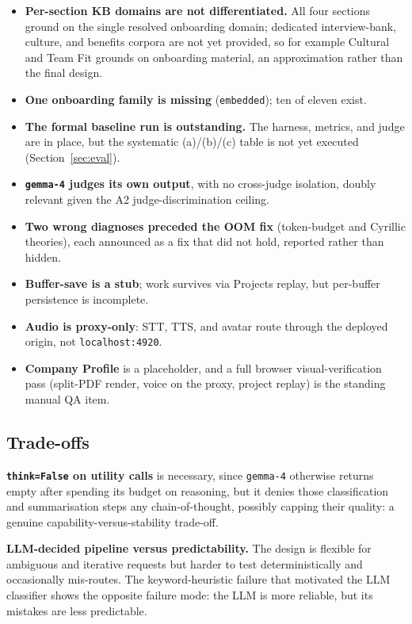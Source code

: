 \begin{itemize}
  \item \textbf{Per-section KB domains are not differentiated.} All four sections ground on
    the single resolved onboarding domain; dedicated interview-bank, culture, and benefits
    corpora are not yet provided, so for example Cultural and Team Fit grounds on onboarding
    material, an approximation rather than the final design.
  \item \textbf{One onboarding family is missing} (\texttt{embedded}); ten of eleven exist.
  \item \textbf{The formal baseline run is outstanding.} The harness, metrics, and judge are
    in place, but the systematic (a)/(b)/(c) table is not yet executed (Section~\ref{sec:eval}).
  \item \textbf{\texttt{gemma-4} judges its own output}, with no cross-judge isolation,
    doubly relevant given the A2 judge-discrimination ceiling.
  \item \textbf{Two wrong diagnoses preceded the OOM fix} (token-budget and Cyrillic
    theories), each announced as a fix that did not hold, reported rather than hidden.
  \item \textbf{Buffer-save is a stub}; work survives via Projects replay, but per-buffer
    persistence is incomplete.
  \item \textbf{Audio is proxy-only}: STT, TTS, and avatar route through the deployed
    origin, not \verb|localhost:4920|.
  \item \textbf{Company Profile} is a placeholder, and a full browser visual-verification
    pass (split-PDF render, voice on the proxy, project replay) is the standing manual QA
    item.
\end{itemize}

\subsection{Trade-offs}
\label{sec:tradeoffs}

\textbf{\texttt{think=False} on utility calls} is necessary, since \verb|gemma-4| otherwise
returns empty after spending its budget on reasoning, but it denies those classification
and summarisation steps any chain-of-thought, possibly capping their quality: a genuine
capability-versus-stability trade-off.

\textbf{LLM-decided pipeline versus predictability.} The design is flexible for ambiguous
and iterative requests but harder to test deterministically and occasionally mis-routes.
The keyword-heuristic failure that motivated the LLM classifier shows the opposite failure
mode: the LLM is more reliable, but its mistakes are less predictable.


